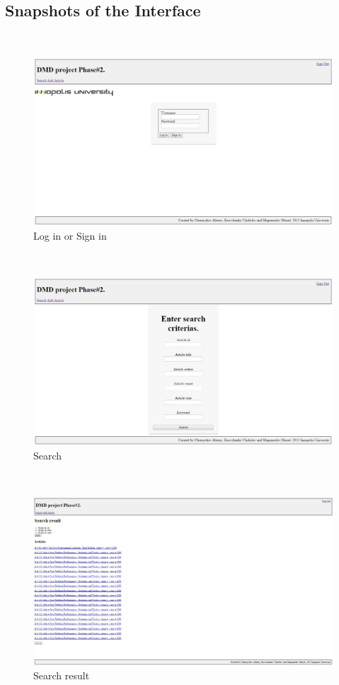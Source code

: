 \documentclass{article}
\begin{document}
\subsection{Snapshots of the Interface}
~
~
\begin{figure}[h!]
  \centering
      \includegraphics[width=16cm]{1.jpg}
  \caption{Log in or Sign in}
\end{figure}
~
~
\begin{figure}[h!]
  \centering
      \includegraphics[width=16cm]{2.jpg}
  \caption{Search}
\end{figure}
~
~
\begin{figure}[h!]
  \centering
      \includegraphics[width=16cm]{3.jpg}
  \caption{Search result}
\end{figure}
\end{document}

